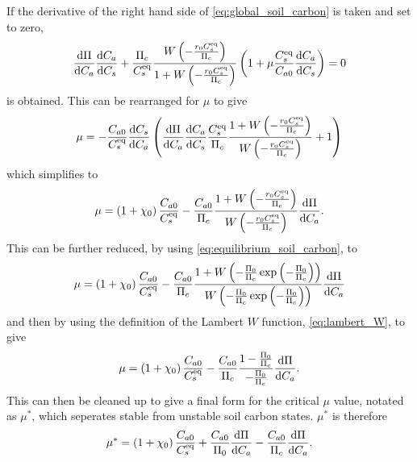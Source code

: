 If the derivative of the right hand side of \cref{eq:global_soil_carbon} is taken and set to zero, 
\begin{equation}
  \label{eq:soil_carbon_lambda}
  \dv{\Pi}{C_a}\dv{C_a}{C_s} + \frac{\Pi_c}{C_s^{\mathrm{eq}}} \frac{W\left(-\frac{r_0C_s^{\mathrm{eq}}}{\Pi_c}\right)}{1+W\left(-\frac{r_0C_s^{\mathrm{eq}}}{\Pi_c}\right)} \left(
    1 + \mu \frac{C_s^{\mathrm{eq}}}{C_{a0}} \dv{C_a}{C_s}\right) = 0
\end{equation}
is obtained. This can be rearranged for $\mu$ to give
\begin{equation}
  \label{eq:critical_mu}
  \mu = -\frac{C_{a0}}{C_{s}^{\mathrm{eq}}}\dv{C_s}{C_a}\left(\dv{\Pi}{C_a}\dv{C_a}{C_s} \frac{C_s^{\mathrm{eq}}}{\Pi_c}\frac{1+W\left(-\frac{r_0C_s^{\mathrm{eq}}}{\Pi_c}\right)}{W\left(-\frac{r_0C_s^{\mathrm{eq}}}{\Pi_c}\right)} + 1 \right)
\end{equation}
which simplifies to
\begin{equation}
  \label{eq:critical_mu_simple_ocean}
  \mu = \left(1+\chi_0\right) \frac{C_{a0}}{C_{s}^{\mathrm{eq}}} -
  \frac{C_{a0}}{\Pi_c}\frac{1+W\left(-\frac{r_0C_s^{\mathrm{eq}}}{\Pi_c}\right)}{W\left(-\frac{r_0C_s^{\mathrm{eq}}}{\Pi_c}\right)}\dv{\Pi}{C_a}.
\end{equation}
This can be further reduced, by using \cref{eq:equilibrium_soil_carbon}, to
\begin{equation*}
  \mu = \left(1+\chi_0\right) \frac{C_{a0}}{C_{s}^{\mathrm{eq}}} -
  \frac{C_{a0}}{\Pi_c}
  \frac{1+W\left(-\frac{\Pi_0}{\Pi_c}\exp\left(-\frac{\Pi_0}{\Pi_c}\right)\right)}
  {W\left(-\frac{\Pi_0}{\Pi_c}\exp\left(-\frac{\Pi_0}{\Pi_c}\right)\right)}\dv{\Pi}{C_a} 
\end{equation*}
and then by using the definition of the Lambert $W$ function, \cref{eq:lambert_W}, to give
\begin{equation*}
  \mu = \left(1+\chi_0\right) \frac{C_{a0}}{C_{s}^{\mathrm{eq}}} -
  \frac{C_{a0}}{\Pi_c}
  \frac{1-\frac{\Pi_0}{\Pi_c}}{-\frac{\Pi_0}{\Pi_c}}\dv{\Pi}{C_a}.
\end{equation*}
This can then be cleaned up to give a final form for the critical $\mu$ value, notated as $\mu^*$, which seperates stable from unstable soil
carbon states. $\mu^*$ is therefore
\begin{equation}
  \label{eq:critical_mu_simple_ocean_in_terms_of_npp}
  \mu^* = \left(1+\chi_0\right) \frac{C_{a0}}{C_{s}^{\mathrm{eq}}} +
  \frac{C_{a0}}{\Pi_0} \dv{\Pi}{C_a} - \frac{C_{a0}}{\Pi_c}\dv{\Pi}{C_a}.
\end{equation}
